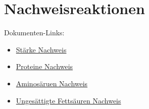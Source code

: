 \section{Nachweisreaktionen}
Dokumenten-Links:
\begin{itemize}
    \item \hyperref[sec:nachweis_stärke]{Stärke Nachweis}
    \item \hyperref[sec:nachweis_proteine]{Proteine Nachweis}
    \item \hyperref[sec:nachweis_amino]{Aminosäruen Nachweis}
    \item \hyperref[sec:nachweis_ung_fettsäuren]{Ungesättigte Fettsäuren Nachweis}
\end{itemize}
